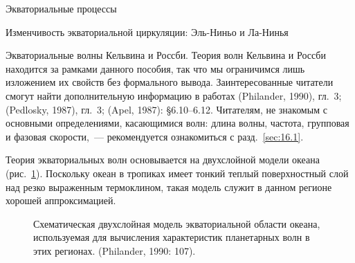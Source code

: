 \begin{chapter}{Экваториальные процессы}
\begin{section}{Изменчивость экваториальной циркуляции: Эль-Ниньо и Ла-Нинья}
\begin{paragraph}{Экваториальные волны Кельвина и Россби.}
Теория волн Кельвина и Россби находится за рамками
данного пособия, так что мы ограничимся лишь изложением их свойств без
формального вывода. Заинтересованные читатели смогут найти дополнительную
информацию в работах (Philander, 1990), гл.~3; (Pedlosky, 1987), гл.~3;
(Apel, 1987): \S6.10--6.12. Читателям, не знакомым с основными определениями,
касающимися волн: длина волны, частота, групповая и фазовая скорости,~--- 
рекомендуется ознакомиться с разд.~\ref{sec:16.1}.
%

Теория экваториальных волн основывается на двухслойной модели океана
(рис.~\ref{fig:modelsketch}). Поскольку океан в тропиках имеет тонкий теплый
поверхностный слой над резко выраженным термоклином,
такая модель служит в данном регионе хорошей аппроксимацией.
%

\begin{figure}[t!]
\begin{center}
\end{center}
\caption{Схематическая двухслойная модель экваториальной области океана,
используемая для вычисления характеристик планетарных волн в этих регионах.
(Philander, 1990: 107).}
\label{fig:modelsketch}
\end{figure}
%


\end{paragraph}
\end{section}
\end{chapter}
